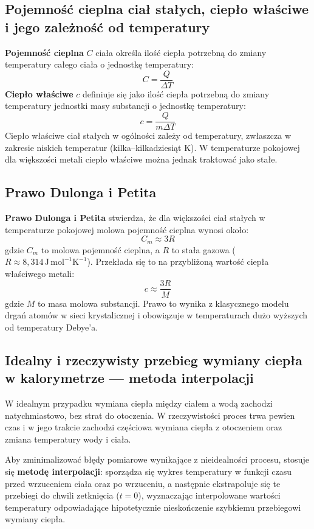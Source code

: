 \documentclass{article}
\begin{document}
\subsection*{Pojemność cieplna ciał stałych, ciepło właściwe i jego zależność od temperatury}

\textbf{Pojemność cieplna} \( C \) ciała określa ilość ciepła potrzebną do zmiany temperatury całego ciała o jednostkę temperatury:
\[
    C = \frac{Q}{\Delta T}
\]
\textbf{Ciepło właściwe} \( c \) definiuje się jako ilość ciepła potrzebną do zmiany temperatury jednostki masy substancji o jednostkę temperatury:
\[
    c = \frac{Q}{m \Delta T}
\]
Ciepło właściwe ciał stałych w ogólności zależy od temperatury, zwłaszcza w zakresie niskich temperatur (kilka–kilkadziesiąt K). W temperaturze pokojowej dla większości metali ciepło właściwe można jednak traktować jako stałe.

\subsection*{Prawo Dulonga i Petita}

\textbf{Prawo Dulonga i Petita} stwierdza, że dla większości ciał stałych w temperaturze pokojowej molowa pojemność cieplna wynosi około:
\[
    C_m \approx 3R
\]
gdzie \( C_m \) to molowa pojemność cieplna, a \( R \) to stała gazowa (\( R \approx 8{,}314\, \mathrm{J\,mol^{-1}K^{-1}} \)).
Przekłada się to na przybliżoną wartość ciepła właściwego metali:
\[
    c \approx \frac{3R}{M}
\]
gdzie \( M \) to masa molowa substancji. Prawo to wynika z klasycznego modelu drgań atomów w sieci krystalicznej i obowiązuje w temperaturach dużo wyższych od temperatury Debye'a.

\subsection*{Idealny i rzeczywisty przebieg wymiany ciepła w kalorymetrze — metoda interpolacji}

W idealnym przypadku wymiana ciepła między ciałem a wodą zachodzi natychmiastowo, bez strat do otoczenia. W rzeczywistości proces trwa pewien czas i w jego trakcie zachodzi częściowa wymiana ciepła z otoczeniem oraz zmiana temperatury wody i ciała.

Aby zminimalizować błędy pomiarowe wynikające z nieidealności procesu, stosuje się \textbf{metodę interpolacji}: sporządza się wykres temperatury w funkcji czasu przed wrzuceniem ciała oraz po wrzuceniu, a następnie ekstrapoluje się te przebiegi do chwili zetknięcia (\( t=0 \)), wyznaczając interpolowane wartości temperatury odpowiadające hipotetycznie nieskończenie szybkiemu przebiegowi wymiany ciepła.
\end{document}
